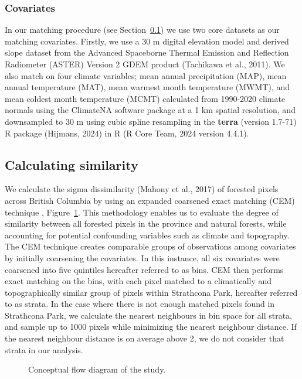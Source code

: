 \documentclass[
]{agujournal2019}
\begin{document}
\subsubsection{Covariates}\label{covariates}

In our matching procedure (see Section~\ref{sec-sim}) we use two core
datasets as our matching covariates. Firstly, we use a 30 m digital
elevation model and derived slope dataset from the Advanced Spaceborne
Thermal Emission and Reflection Radiometer (ASTER) Version 2 GDEM
product (Tachikawa et al., 2011). We also match on four climate
variables; mean annual precipitation (MAP), mean annual temperature
(MAT), mean warmest month temperature (MWMT), and mean coldest month
temperature (MCMT) calculated from 1990-2020 climate normals using the
ClimateNA software package at a 1 km spatial resolution, and downsampled
to 30 m using cubic spline resampling in the \textbf{terra} (version
1.7-71) R package (Hijmans, 2024) in R (R Core Team, 2024 version
4.4.1).

\subsection{Calculating similarity}\label{sec-sim}

We calculate the sigma dissimilarity (Mahony et al., 2017) of forested
pixels across British Columbia by using an expanded coarsened exact
matching (CEM) technique , Figure~\ref{fig-flow}. This methodology
enables us to evaluate the degree of similarity between all forested
pixels in the province and natural forests, while accounting for
potential confounding variables such as climate and topography. The CEM
technique creates comparable groups of observations among covariates by
initially coarsening the covariates. In this instance, all six
covariates were coarsened into five quintiles hereafter referred to as
bins. CEM then performs exact matching on the bins, with each pixel
matched to a climatically and topographically similar group of pixels
within Strathcona Park, hereafter referred to as strata. In the case
where there is not enough matched pixels found in Strathcona Park, we
calculate the nearest neighbours in bin space for all strata, and sample
up to 1000 pixels while minimizing the nearest neighbour distance. If
the nearest neighbour distance is on average above 2, we do not consider
that strata in our analysis.

\label{cell-fig-flow}
\begin{figure}[H]


\caption{\label{fig-flow}Conceptual flow diagram of the study.}

\end{figure}%
\end{document}
